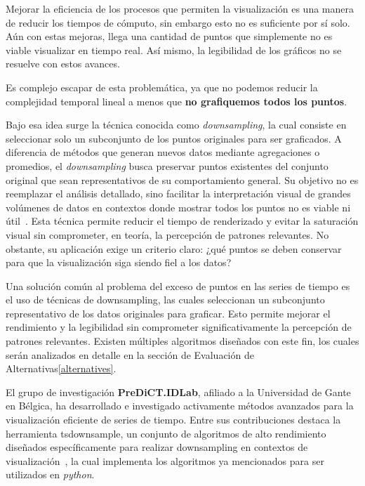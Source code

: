Mejorar la eficiencia de los procesos que permiten la visualización es una manera de reducir los tiempos de cómputo, sin embargo esto no es suficiente por sí solo. Aún con estas mejoras, llega una cantidad de puntos que simplemente no es viable visualizar en tiempo real. Así mismo, la legibilidad de los gráficos no se resuelve con estos avances.

Es complejo escapar de esta problemática, ya que no podemos reducir la complejidad temporal lineal a menos que \textbf{no grafiquemos todos los puntos}.

Bajo esa idea surge la técnica conocida como \textit{downsampling}, la cual consiste en seleccionar solo un subconjunto de los puntos originales para ser graficados. A diferencia de métodos que generan nuevos datos mediante agregaciones o promedios, el \textit{downsampling} busca preservar puntos existentes del conjunto original que sean representativos de su comportamiento general. Su objetivo no es reemplazar el análisis detallado, sino facilitar la interpretación visual de grandes volúmenes de datos en contextos donde mostrar todos los puntos no es viable ni útil~\cite{steinarsson2013downsampling}. Esta técnica permite reducir el tiempo de renderizado y evitar la saturación visual sin comprometer, en teoría, la percepción de patrones relevantes. No obstante, su aplicación exige un criterio claro: ¿qué puntos se deben conservar para que la visualización siga siendo fiel a los datos?

Una solución común al problema del exceso de puntos en las series de tiempo es el uso de técnicas de downsampling, las cuales seleccionan un subconjunto representativo de los datos originales para graficar. Esto permite mejorar el rendimiento y la legibilidad sin comprometer significativamente la percepción de patrones relevantes. Existen múltiples algoritmos diseñados con este fin, los cuales serán analizados en detalle en la sección de Evaluación de Alternativas\ref{alternatives}.

El grupo de investigación \textbf{PreDiCT.IDLab}, afiliado a la Universidad de Gante en Bélgica, ha desarrollado e investigado activamente métodos avanzados para la visualización eficiente de series de tiempo. Entre sus contribuciones destaca la herramienta tsdownsample, un conjunto de algoritmos de alto rendimiento diseñados específicamente para realizar downsampling en contextos de visualización~\cite{tsdownsample}, la cual implementa los algoritmos ya mencionados para ser utilizados en \textit{python}.


